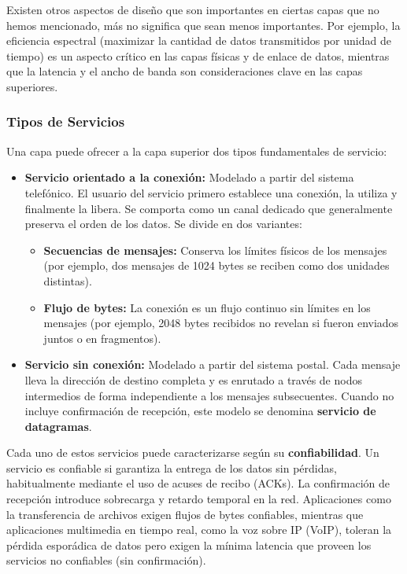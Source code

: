 Existen otros aspectos de diseño que son importantes en ciertas capas que no hemos mencionado, más no significa que sean menos importantes. Por ejemplo, la eficiencia espectral (maximizar la cantidad de datos transmitidos por unidad de tiempo) es un aspecto crítico en las capas físicas y de enlace de datos, mientras que la latencia y el ancho de banda son consideraciones clave en las capas superiores.

\subsubsection{Tipos de Servicios}

Una capa puede ofrecer a la capa superior dos tipos fundamentales de servicio:

\begin{itemize}
  \item \textbf{Servicio orientado a la conexión:} Modelado a partir del sistema telefónico. El usuario del servicio primero establece una conexión, la utiliza y finalmente la libera. Se comporta como un canal dedicado que generalmente preserva el orden de los datos. Se divide en dos variantes:
  \begin{itemize}
    \item \textbf{Secuencias de mensajes:} Conserva los límites físicos de los mensajes (por ejemplo, dos mensajes de 1024 bytes se reciben como dos unidades distintas).
    \item \textbf{Flujo de bytes:} La conexión es un flujo continuo sin límites en los mensajes (por ejemplo, 2048 bytes recibidos no revelan si fueron enviados juntos o en fragmentos).
  \end{itemize}

  \item \textbf{Servicio sin conexión:} Modelado a partir del sistema postal. Cada mensaje lleva la dirección de destino completa y es enrutado a través de nodos intermedios de forma independiente a los mensajes subsecuentes. Cuando no incluye confirmación de recepción, este modelo se denomina \textbf{servicio de datagramas}.
\end{itemize}

Cada uno de estos servicios puede caracterizarse según su \textbf{confiabilidad}. Un servicio es confiable si garantiza la entrega de los datos sin pérdidas, habitualmente mediante el uso de acuses de recibo (ACKs). La confirmación de recepción introduce sobrecarga y retardo temporal en la red. Aplicaciones como la transferencia de archivos exigen flujos de bytes confiables, mientras que aplicaciones multimedia en tiempo real, como la voz sobre IP (VoIP), toleran la pérdida esporádica de datos pero exigen la mínima latencia que proveen los servicios no confiables (sin confirmación).

